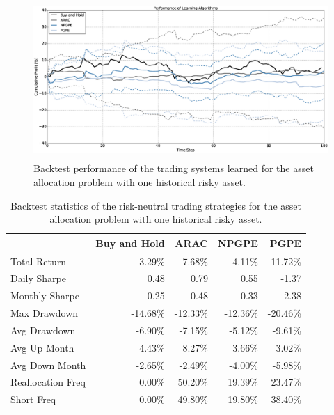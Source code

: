 \begin{figure}[t!]
	\centering
	\includegraphics[height=6cm,width=1.0\textwidth]{Images/8_9_single_hist_neutral_performance}
	\caption[Backtest performance with one historical risky asset.]{Backtest performance of the trading systems learned for the asset allocation problem with one historical risky asset.}
	\label{fig:8_9_single_hist_neutral_performance}
\end{figure}

\begin{table}[t!]
\centering
\begin{tabular}{@{}lrrrr@{}}
\toprule
                  & Buy and Hold & ARAC     & NPGPE    & PGPE     \\ \midrule
Total Return      & 3.29\%       & 7.68\%   & 4.11\%   & -11.72\% \\
Daily Sharpe      & 0.48         & 0.79     & 0.55     & -1.37    \\
Monthly Sharpe    & -0.25        & -0.48    & -0.33    & -2.38    \\
Max Drawdown      & -14.68\%     & -12.33\% & -12.36\% & -20.46\% \\
Avg Drawdown      & -6.90\%      & -7.15\%  & -5.12\%  & -9.61\%  \\
Avg Up Month      & 4.43\%       & 8.27\%   & 3.66\%   & 3.02\%   \\
Avg Down Month    & -2.65\%      & -2.49\%  & -4.00\%  & -5.98\%  \\
Reallocation Freq & 0.00\%       & 50.20\%  & 19.39\%  & 23.47\%  \\
Short Freq        & 0.00\%       & 49.80\%  & 19.80\%  & 38.40\%  \\ \bottomrule
\end{tabular}
\caption[Backtest statistics for risk-neutral learning with one historical risky asset.]{Backtest statistics of the risk-neutral trading strategies for the asset allocation problem with one historical risky asset.}
\label{tab:single_historical_neutral_performance}
\end{table}
\clearpage

